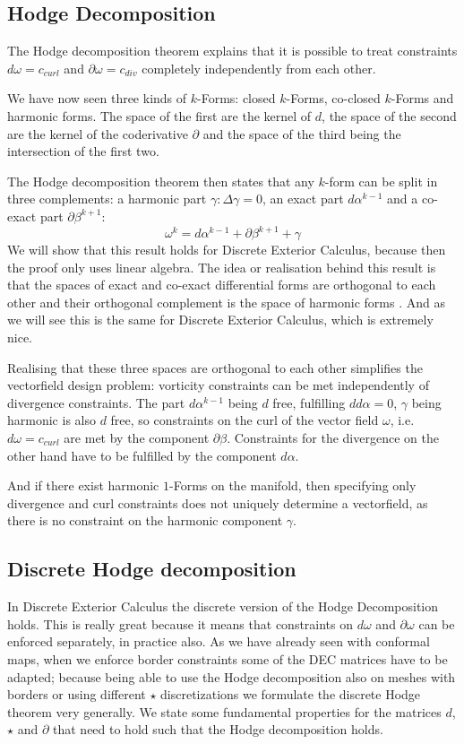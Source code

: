\subsection{Hodge Decomposition}
The Hodge decomposition theorem explains that it is possible to treat constraints $d\omega = c_{curl}$ and $\partial \omega = c_{div}$ completely independently from each other.

We have now seen three kinds of $k$-Forms: closed $k$-Forms, co-closed $k$-Forms and harmonic forms. The space of the first are the kernel of $d$, the space of the second are the kernel of the coderivative $\partial$ and the space of the third being the intersection of the first two.

The Hodge decomposition theorem then states that any $k$-form can be split in three complements: a harmonic part $\gamma: \Delta \gamma = 0$, an exact part $d\alpha^{k-1}$ and a co-exact part $\partial \beta^{k+1}$:
\[\omega^k = d\alpha^{k-1} + \partial \beta^{k+1} + \gamma\]
We will show that this result holds for Discrete Exterior Calculus, because then the proof only uses linear algebra. The idea or realisation behind this result is that the spaces of exact and co-exact differential forms are orthogonal to each other and their orthogonal complement is the space of harmonic forms . And as we will see this is the same for Discrete Exterior Calculus, which is extremely nice.

Realising that these three spaces are orthogonal to each other simplifies the vectorfield design problem: vorticity constraints can be met independently of divergence constraints. The part $d\alpha^{k-1}$ being $d$ free, fulfilling $dd\alpha = 0$, $\gamma$ being harmonic is also $d$ free, so constraints on the curl of the vector field $\omega$, i.e. $d\omega = c_{curl}$ are met by the component $\partial \beta$. Constraints for the divergence on the other hand have to be fulfilled by the component $d\alpha$.

And if there exist harmonic $1$-Forms on the manifold, then specifying only divergence and curl constraints does not uniquely determine a vectorfield, as there is no constraint on the harmonic component $\gamma$.

\subsection{Discrete Hodge decomposition}
In Discrete Exterior Calculus the discrete version of the Hodge Decomposition holds. This is really great because it means that constraints on $d\omega$ and $\partial \omega$ can be enforced separately, in practice also. As we have already seen with conformal maps, when we enforce border constraints some of the DEC matrices have to be adapted; because being able to use the Hodge decomposition also on meshes with borders or using different $\star$ discretizations we formulate the discrete Hodge theorem very generally. We state some fundamental properties for the matrices $d$, $\star$ and $\partial$ that need to hold such that the Hodge decomposition holds. 

